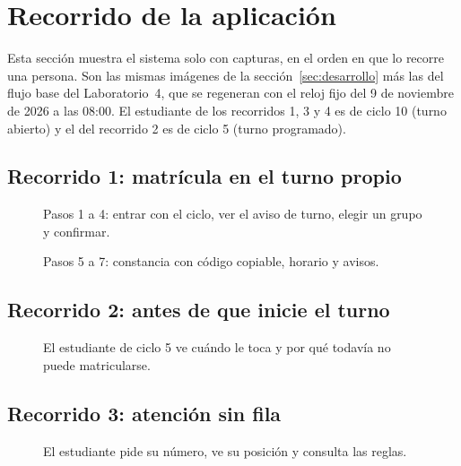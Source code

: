 \section{Recorrido de la aplicación}
\label{sec:recorrido}

Esta sección muestra el sistema solo con capturas, en el orden en que lo recorre una persona. Son las mismas imágenes de la sección~\ref{sec:desarrollo} más las del flujo base del Laboratorio~4, que se regeneran con el reloj fijo del 9 de noviembre de 2026 a las 08:00. El estudiante de los recorridos 1, 3 y 4 es de ciclo 10 (turno abierto) y el del recorrido 2 es de ciclo 5 (turno programado).

\subsection{Recorrido 1: matrícula en el turno propio}
\begin{figure}[H]
\centering
{}\hfill
{}\hfill
{}\hfill
{}
\caption{Pasos 1 a 4: entrar con el ciclo, ver el aviso de turno, elegir un grupo y confirmar.}
\end{figure}

\begin{figure}[H]
\centering
{}\hspace{0.04\textwidth}
\hspace{0.04\textwidth}
\caption{Pasos 5 a 7: constancia con código copiable, horario y avisos.}
\end{figure}

\subsection{Recorrido 2: antes de que inicie el turno}
\begin{figure}[H]
\centering
{}\hspace{0.04\textwidth}
\hspace{0.04\textwidth}
\caption{El estudiante de ciclo 5 ve cuándo le toca y por qué todavía no puede matricularse.}
\end{figure}

\subsection{Recorrido 3: atención sin fila}
\begin{figure}[H]
\centering
{}\hspace{0.04\textwidth}
\hspace{0.04\textwidth}
\caption{El estudiante pide su número, ve su posición y consulta las reglas.}
\end{figure}

